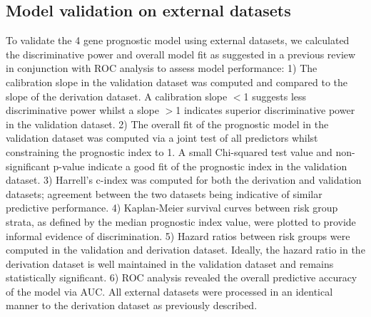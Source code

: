 \documentclass[twocolumn]{bmcart}%
\begin{document}
\subsection*{\textbf{Model validation on external datasets}}
To validate the 4 gene prognostic model using external datasets, we calculated the discriminative power and overall model fit as suggested in a previous review \cite{Royston2013Dec} in conjunction with ROC analysis to assess model performance: 1) The calibration slope in the validation dataset was computed and compared to the slope of the derivation dataset. A calibration slope $<$1 suggests less discriminative power whilst a slope $>$1 indicates superior discriminative power in the validation dataset. 2) The overall fit of the prognostic model in the validation dataset was computed via a joint test of all predictors whilst constraining the prognostic index to 1. A small Chi-squared test value and non-significant p-value indicate a good fit of the prognostic index in the validation dataset. 3) Harrell's c-index was computed for both the derivation and validation datasets; agreement between the two datasets being indicative of similar predictive performance. 4) Kaplan-Meier survival curves between risk group strata, as defined by the median prognostic index value, were plotted to provide informal evidence of discrimination. 5) Hazard ratios between risk groups were computed in the validation and derivation dataset. Ideally, the hazard ratio in the derivation dataset is well maintained in the validation dataset and remains statistically significant. 6) ROC analysis revealed the overall predictive accuracy of the model via AUC. All external datasets were processed in an identical manner to the derivation dataset as previously described.
\end{document}
